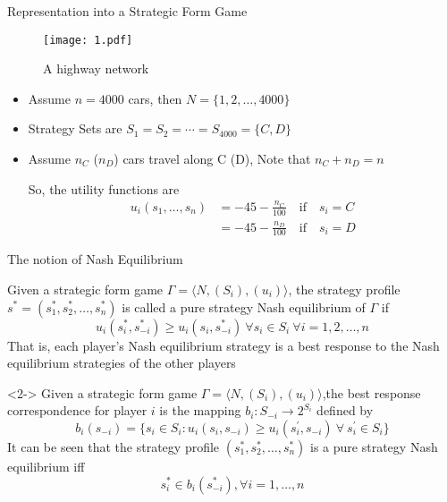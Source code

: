 \documentclass[10pt]{beamer}  %
\begin{document}
\begin{frame}{Representation into a Strategic Form Game}   %
    \begin{figure}
        \centering
        \texttt{[image: 1.pdf]}
        \caption{A highway network}
    \end{figure}
    \begin{itemize}
        \item Assume $n=4000$ cars, then $N=\{1,2,\ldots,4000\}$
        \item Strategy Sets are $S_1=S_2=\cdots=S_{4000}=\{C,D\}$
        \item Assume $n_C$ ($n_D$) cars travel along C (D), Note that $n_C+n_D=n$

        So, the utility functions are
        \begin{align*}
            u_i(s_1,\ldots,s_n)&=-45-\frac{n_C}{100} \quad \text{if} \quad s_i = C\\
            &=-45-\frac{n_D}{100} \quad \text{if} \quad s_i = D
        \end{align*}
    \end{itemize}
\end{frame}

\begin{frame}{The notion of Nash Equilibrium}   %
    \begin{definition}
        Given a strategic form game $\Gamma = \langle N,(S_i),(u_i)\rangle$, the strategy profile $s^*=(s_1^*,s_2^*,\ldots,s_n^*)$ is called a pure strategy Nash equilibrium of $\Gamma$ if
        \[u_i(s^*_i,s^*_{-i})\geq u_i(s_i,s^*_{-i})\ \forall s_{i} \in S_{i}\ \forall i=1,2,\ldots,n\]
        That is, each player’s Nash equilibrium strategy is a best response to the Nash equilibrium strategies of the other players
    \end{definition}

    \begin{definition}<2->
        Given a strategic form game $\Gamma = \langle N,(S_i),(u_i)\rangle$,the best response correspondence for player $i$ is the mapping $b_i : S_{-i} \rightarrow 2^{S_i}$ defined by
        \[b_i(s_{-i}) = \{s_i \in S_i : u_i(s_i, s_{-i}) \geq u_i(s^\prime_i, s_{-i}) \ \forall\  s^\prime_i \in S_i\}\]
        It can be seen that the strategy profile $(s_1^*,s_2^*,\ldots,s_n^*)$ is a pure strategy Nash equilibrium iff
        \[s^*_i \in b_i(s^*_{-i}), \forall i = 1,\ldots, n\]
    \end{definition}
\end{frame}
\end{document}
